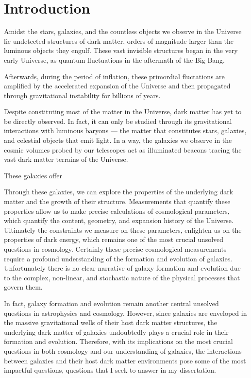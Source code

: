 \chapter*{Introduction}
Amidst the stars, galaxies, and the countless objects we observe in the Universe lie
undetected structures of dark matter, orders of magnitude larger than the luminous objects they
engulf. These vast invisible structures began in the very early Universe, as quantum 
fluctuations in the aftermath of the Big Bang. 

Afterwards, during the period of inflation, these primordial fluctations are amplified by 
the accelerated expansion of the Universe and then propagated through gravitational 
instability for billions of years. 

Despite constituting most of the matter in the Universe, dark matter has yet to be directly 
observed. In fact, it can only be studied through its gravitational interactions with luminous 
baryons — the matter that constitutes stars, galaxies, and celestial objects that emit light. 
In a way, the galaxies we observe in the cosmic volumes probed by our telescopes act as 
illuminated beacons tracing the vast dark matter terrains of the Universe.

These galaxies offer 

Through these galaxies, we can explore the properties of the underlying dark matter
and the growth of their structure. Measurements that quantify these properties allow us to make
precise calculations of cosmological parameters, which quantify the content, geometry, and
expansion history of the Universe. Ultimately the constraints we measure on these parameters,
enlighten us on the properties of dark energy, which remains one of the most crucial unsolved
questions in cosmology. Certainly these precise cosmological measurements require a profound
understanding of the formation and evolution of galaxies. Unfortunately there is no clear
narrative of galaxy formation and evolution due to the complex, non-linear, and stochastic nature
of the physical processes that govern them.

In fact, galaxy formation and evolution remain another central unsolved questions in
astrophysics and cosmology. However, since galaxies are enveloped in the massive gravitational
wells of their host dark matter structures, the underlying dark matter of galaxies undoubtedly
plays a crucial role in their formation and evolution. Therefore, with its implications on the most
crucial questions in both cosmology and our understanding of galaxies, the interactions between
galaxies and their host dark matter environments pose some of the most impactful questions,
questions that I seek to answer in my dissertation. 


